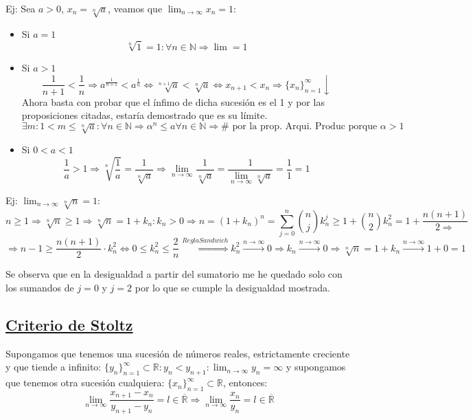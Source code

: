 \documentclass[10pt,a4paper,openright]{book}
\begin{document}
Ej: Sea $a>0$, $x_n=\sqrt[n]{a}$, veamos que $\lim_{n\rightarrow \infty}x_n=1$:
\begin{itemize}
\item Si $a=1$
$$\sqrt[n]{1}=1:\forall n\in \mathbb N\Rightarrow \lim =1$$

\item Si $a>1$
$$\frac{1}{n+1}<\frac{1}{n}\Rightarrow a^{\frac{1}{n+1}}<a^{\frac{1}{n}}\Leftrightarrow \sqrt[n+1]{a}<\sqrt[n]{a}\Leftrightarrow x_{n+1}< x_n\Rightarrow \{x_n\}_{n=1}^\infty \downarrow$$
Ahora basta con probar que el ínfimo de dicha sucesión es el 1 y por las proposiciones citadas, estaría demostrado que es su límite.
$$\exists m: 1<m\leq \sqrt[n]{a}: \forall n\in \mathbb N\Rightarrow \alpha^n\leq a \forall n\in \mathbb N\Rightarrow \#\mbox{ por la prop. Arqui. Produc porque }\alpha>1$$

\item Si $0<a<1$
$$\frac{1}{a}>1\Rightarrow \sqrt[n]{\frac{1}{a}}=\frac{1}{\sqrt[n]{a}}\Rightarrow \lim_{n\rightarrow \infty} \frac{1}{\sqrt[n]{a}}=\frac{1}{\lim_{n\rightarrow \infty} \sqrt[n]{a}}=\frac{1}{1}=1$$
\end{itemize}

Ej: $\lim_{n\rightarrow \infty}\sqrt[n]{n}=1$:
$$n\geq 1\Rightarrow \sqrt[n]{n}\geq 1\Rightarrow \sqrt[n]{n}=1+k_n: k_n>0\Rightarrow n=(1+k_n)^n=\sum_{j=0}^n \binom{n}{j}k_n^j\geq 1+\binom{n}{2}k_n^2=1+\frac{n(n+1)}{2\Rightarrow}$$
$$\Rightarrow n-1\geq \frac{n(n+1)}{2}\cdot k_n^2\Leftrightarrow 0\leq k_n^2\leq \frac{2}{n}\stackrel{ReglaSandwich}{\Rightarrow} k_n^2\stackrel{n\rightarrow \infty}{\rightarrow} 0\Rightarrow k_n\stackrel{n\rightarrow \infty}{\rightarrow} 0\Rightarrow \sqrt[n]{n}=1+k_n \stackrel{n\rightarrow \infty}{\rightarrow} 1+0=1$$

Se observa que en la desigualdad a partir del sumatorio me he quedado solo con los sumandos de $j=0$ y $j=2$ por lo que se cumple la desigualdad mostrada.



\subsection*{\underline{Criterio de Stoltz}}
Supongamos que tenemos una sucesión de números reales, estrictamente creciente y que tiende a infinito: $\{y_n\}_{n=1}^\infty\subset \mathbb R: y_n<y_{n+1}: \lim_{n\rightarrow \infty} y_n=\infty$ y supongamos que tenemos otra sucesión cualquiera: $\{x_n\}_{n=1}^\infty\subset \mathbb R$, entonces:
$$\lim_{n\rightarrow \infty} \frac{x_{n+1}-x_n}{y_{n+1}-y_n}=l\in \overline{\mathbb R}\Rightarrow \lim_{n\rightarrow \infty} \frac{x_n}{y_n}=l\in \overline{\mathbb R}$$
\end{document}
